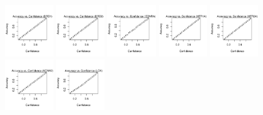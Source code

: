 \documentclass[10pt,article]{memoir}
\begin{document}
\begin{figure}[h!]
\includegraphics[width=0.19\textwidth]{figures/calibration_plots/drd1_calib.pdf}
\includegraphics[width=0.19\textwidth]{figures/calibration_plots/drd2_calib.pdf}
\includegraphics[width=0.19\textwidth]{figures/calibration_plots/ednra_calib.pdf}
\includegraphics[width=0.19\textwidth]{figures/calibration_plots/htr1a_calib.pdf}
\includegraphics[width=0.19\textwidth]{figures/calibration_plots/htr2a_calib.pdf}
\includegraphics[width=0.19\textwidth]{figures/calibration_plots/kcnh2_calib.pdf}
\includegraphics[width=0.19\textwidth]{figures/calibration_plots/lck_calib.pdf}

\end{figure}
\end{document}
